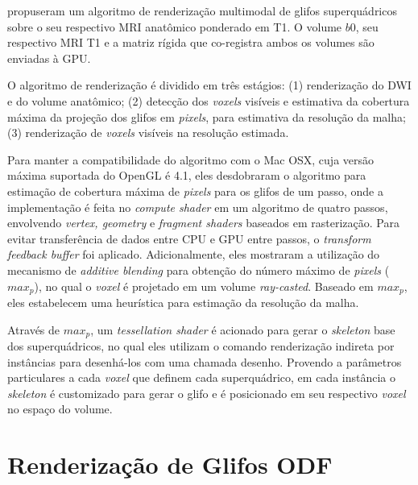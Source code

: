 \documentclass[
    12pt,                %
    oneside,            %
    a4paper,            %
    english,            %
    french,                %
    spanish,            %
    brazil                %
    ]{abntex2}
\begin{document}
 propuseram um algoritmo de renderização multimodal de glifos superquádricos sobre o seu respectivo MRI anatômico ponderado em T1. O volume $b0$, seu respectivo MRI T1 e a matriz rígida que co-registra ambos os volumes \cite{ting2014} são enviadas à GPU.

O algoritmo de renderização é dividido em três estágios: (1) renderização do DWI e do volume anatômico; (2) detecção dos \textit{voxels} visíveis e estimativa da cobertura máxima da projeção dos glifos em \textit{pixels}, para estimativa da resolução da malha; (3) renderização de \textit{voxels} visíveis na resolução estimada.

Para manter a compatibilidade do algoritmo com o Mac OSX, cuja versão máxima suportada do OpenGL é 4.1, eles desdobraram o algoritmo para estimação de cobertura máxima de \textit{pixels} para os glifos de um passo, onde a implementação é feita no \textit{compute shader} em um algoritmo de quatro passos, envolvendo \textit{vertex, geometry} e \textit{fragment shaders} baseados em rasterização. Para evitar transferência de dados entre CPU e GPU entre passos, o \textit{transform feedback buffer} foi aplicado. Adicionalmente, eles mostraram a utilização do mecanismo de \textit{additive blending} para obtenção do número máximo de \textit{pixels} ($max_p$), no qual o \textit{voxel} é projetado em um volume \textit{ray-casted}. Baseado em $max_p$, eles estabelecem uma heurística para estimação da resolução da malha.

Através de $max_p$, um \textit{tessellation shader} é acionado para gerar o \textit{skeleton} base dos superquádricos, no qual eles utilizam o comando renderização indireta por instâncias para desenhá-los com uma chamada desenho. Provendo a parâmetros particulares a cada \textit{voxel} que definem cada superquádrico, em cada instância o \textit{skeleton} é customizado para gerar o glifo e é posicionado em seu respectivo \textit{voxel} no espaço do volume.


\section{Renderização de Glifos ODF}
\label{sec::renderizacao_de_glifos_ODF}
\end{document}
